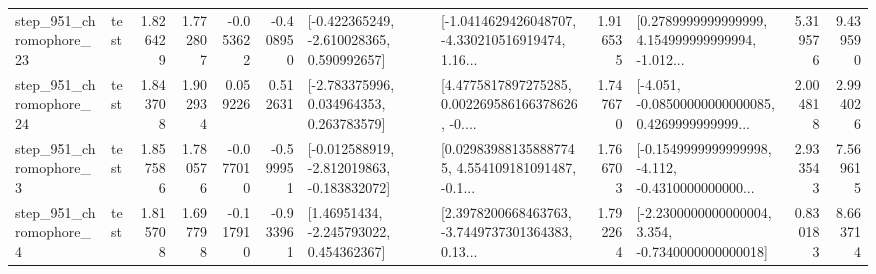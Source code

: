 \begin{tabular}{llrrrrllrlrr}
  step\_951\_chromophore\_23 &      test &      1.826429 &    1.772807 &     -0.053622 & -0.408950 &   [-0.422365249, -2.610028365, 0.590992657] &  [-1.0414629426048707, -4.330210516919474, 1.16... &       1.916535 &  [0.2789999999999999, 4.154999999999994, -1.012... &            5.319576 &          9.439590 \\
  step\_951\_chromophore\_24 &      test &      1.843708 &    1.902934 &      0.059226 &  0.512631 &    [-2.783375996, 0.034964353, 0.263783579] &  [4.4775817897275285, 0.002269586166378626, -0.... &       1.747670 &  [-4.051, -0.08500000000000085, 0.4269999999999... &            2.004818 &          2.994026 \\
   step\_951\_chromophore\_3 &      test &      1.857586 &    1.780576 &     -0.077010 & -0.599951 &  [-0.012588919, -2.812019863, -0.183832072] &  [0.029839881358887745, 4.554109181091487, -0.1... &       1.766703 &  [-0.1549999999999998, -4.112, -0.4310000000000... &            2.933543 &          7.569615 \\
   step\_951\_chromophore\_4 &      test &      1.815708 &    1.697798 &     -0.117910 & -0.933961 &     [1.46951434, -2.245793022, 0.454362367] &  [2.3978200668463763, -3.7449737301364383, 0.13... &       1.792264 &  [-2.2300000000000004, 3.354, -0.7340000000000018] &            0.830183 &          8.663714 \\
\bottomrule
\end{tabular}

